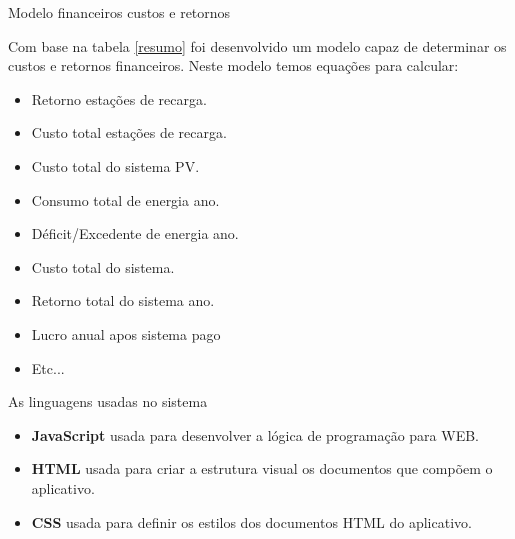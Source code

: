 \documentclass{beamer}
\begin{document}
\begin{frame}{Modelo financeiros custos e retornos}

Com base na tabela \ref{resumo} foi desenvolvido um modelo capaz de determinar os custos e retornos financeiros. Neste modelo temos equações para calcular:

\begin{itemize}
  \item Retorno estações de recarga.
  
  \item Custo total estações de recarga.

  \item Custo total do sistema PV.
  
  \item Consumo total de energia ano.
  
  \item Déficit/Excedente de energia ano.
  
   \item Custo total do sistema.
   
   \item Retorno total do sistema ano.
   
   \item Lucro anual apos sistema pago
   
   \item Etc...
\end{itemize}

\end{frame}


\begin{frame}{As linguagens usadas no sistema}

\begin{itemize}

  \item \textbf{JavaScript} usada para desenvolver a lógica de programação para WEB.
  
  \item \textbf{HTML} usada para criar a estrutura visual os documentos que compõem o aplicativo.

  \item \textbf{CSS} usada para definir os estilos dos documentos HTML do aplicativo.
  
\end{itemize}

\end{frame}

\end{document}
